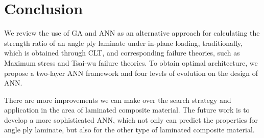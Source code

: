 \section{Conclusion}
We review the use of GA and ANN as an alternative approach for calculating the
strength ratio of an angle ply laminate under in-plane loading, traditionally,
which is obtained through CLT, and corresponding failure theories, such as
Maximum stress and Tsai-wu failure theories. To obtain optimal architecture, we
propose a two-layer ANN framework and four levels of evolution on the design of
ANN.


There are more improvements we can make over the search strategy and 
application in the area of laminated composite material. The future work is to
develop a more sophisticated ANN, which not only can predict the
properties for angle ply laminate, but also for the other type of laminated
composite material.
